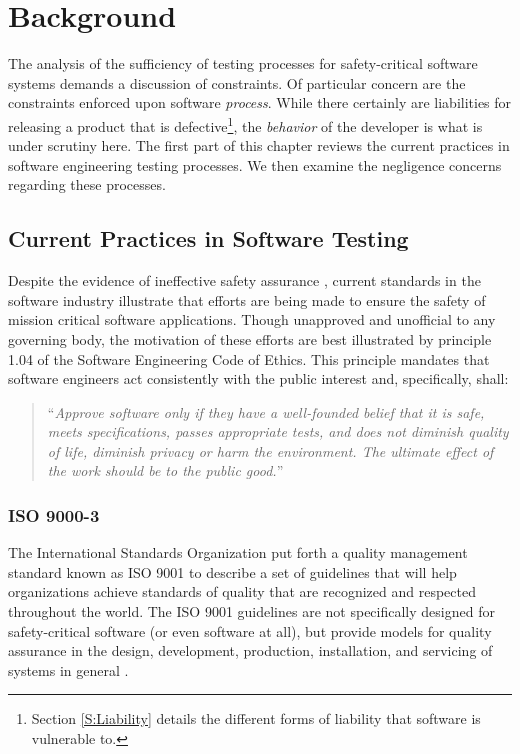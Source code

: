 \chapter{Background}\label{C:Background}
The analysis of the sufficiency of testing processes for safety-critical
software systems demands a discussion of constraints. Of particular concern are
the constraints enforced upon software \textit{process}. While there certainly
are liabilities for releasing a product that is defective\footnote{Section 
\ref{S:Liability} details the different forms of liability that software is
vulnerable to.}, the \textit{behavior} of the developer is what is under
scrutiny here. The first part of this chapter reviews the current practices in
software engineering testing processes. We then examine the negligence concerns
regarding these processes.

\section{Current Practices in Software Testing}
Despite the evidence of ineffective safety assurance \cite{Leveson93,Maisel05},
current standards in the software industry illustrate that efforts are being
made to ensure the safety of mission critical software applications. Though
unapproved and unofficial to any governing body, the motivation of these efforts
are best illustrated by principle 1.04 of the Software Engineering Code of
Ethics. This principle mandates that software engineers act consistently with
the public interest and, specifically, shall:

\begin{quote}
``\textit{Approve software only if they have a well-founded belief that it is
safe, meets specifications, passes appropriate tests, and does not diminish
quality of life, diminish privacy or harm the environment. The ultimate effect
of the work should be to the public good.}''\cite{SECODE}
\end{quote}

\subsection{ISO 9000-3}
The International Standards Organization put forth a quality management standard
known as ISO 9001 to describe a set of guidelines that will help organizations
achieve standards of quality that are recognized and respected throughout the
world. The ISO 9001 guidelines are not specifically designed for safety-critical
software (or even software at all), but provide models for quality assurance
in the design, development, production, installation, and servicing of systems
in general \cite{Kehoe96}.

